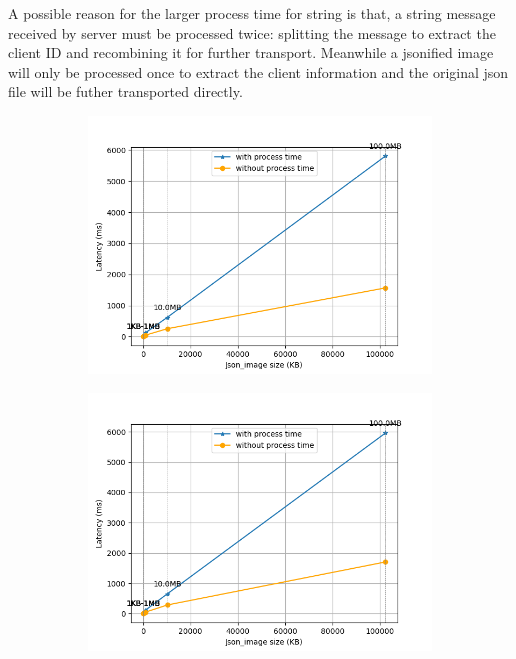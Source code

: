 A possible reason for the larger process time for string is that, a string message 
received by server must be processed twice: splitting the message to extract the client 
ID and recombining it for further transport. Meanwhile a jsonified image will only be 
processed once to extract the client information and the original json file will be 
futher transported directly.     
\begin{figure}[htb]
    \begin{subfigure}[b]{0.49\textwidth}
        \centering
        \includegraphics[width=\textwidth]{figures/tests/proportional_tests/Average_json_image_messages_sending_time_of_100_tests_1KB_to_100MB.png}\hfill 
        \caption{} \label{fig: proportional-imagesize-a}
    \end{subfigure}
    \begin{subfigure}[b]{0.49\textwidth}
        \centering
        \includegraphics[width=\textwidth]{figures/tests/proportional_tests/Average_json_image_messages_receiving_time_of_100_tests_1KB_to_100MB.png}\hfill 

\end{subfigure}
\end{figure}
